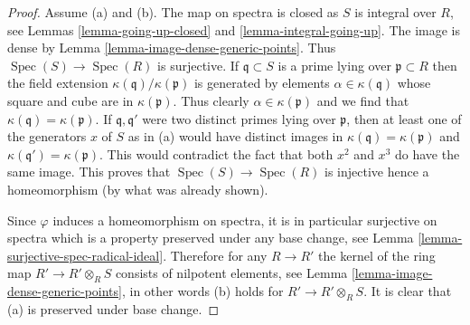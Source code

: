 \documentclass[10pt,a4paper]{amsart}
\theoremstyle{plain}
\theoremstyle{definition}
\theoremstyle{remark}
\numberwithin{equation}{subsection}
\def\Spec{\mathop{\mathrm{Spec}}}
\begin{document}
\begin{proof}
Assume (a) and (b). The map on spectra is closed as $S$ is integral
over $R$, see Lemmas \ref{lemma-going-up-closed} and
\ref{lemma-integral-going-up}. The image is dense by
Lemma \ref{lemma-image-dense-generic-points}. Thus $\Spec(S) \to \Spec(R)$
is surjective. If $\mathfrak q \subset S$ is a prime lying over
$\mathfrak p \subset R$ then the field extension
$\kappa(\mathfrak q)/\kappa(\mathfrak p)$ is generated by elements
$\alpha \in \kappa(\mathfrak q)$ whose square and cube are
in $\kappa(\mathfrak p)$. Thus clearly $\alpha \in \kappa(\mathfrak p)$
and we find that $\kappa(\mathfrak q) = \kappa(\mathfrak p)$.
If $\mathfrak q, \mathfrak q'$ were two distinct primes lying over
$\mathfrak p$, then at least one of the generators $x$ of $S$ as
in (a) would have distinct images in
$\kappa(\mathfrak q) = \kappa(\mathfrak p)$ and
$\kappa(\mathfrak q') = \kappa(\mathfrak p)$.
This would contradict the fact that both $x^2$ and $x^3$
do have the same image. This proves that $\Spec(S) \to \Spec(R)$
is injective hence a homeomorphism (by what was already shown).

\medskip\noindent
Since $\varphi$ induces a homeomorphism on spectra, it is in particular
surjective on spectra which is a property preserved under any base change, see
Lemma \ref{lemma-surjective-spec-radical-ideal}.
Therefore for any $R \to R'$ the kernel of the ring map
$R' \to R' \otimes_R S$ consists of nilpotent elements, see
Lemma \ref{lemma-image-dense-generic-points},
in other words (b) holds for $R' \to R' \otimes_R S$.
It is clear that (a) is preserved under base change.
\end{proof}
\end{document}
